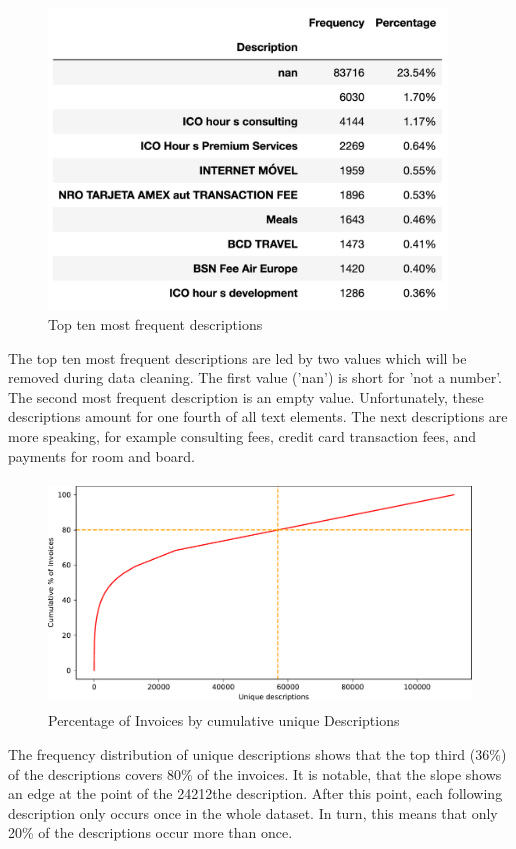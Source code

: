 \begin{figure}[!h]
	\centering
	\includegraphics[height=8cm]{Bilder/data_understanding/toptendescr.png}
	\caption{Top ten most frequent descriptions}
	\label{fig:descr-most-frequent}
\end{figure}
The top ten most frequent descriptions are led by two values which will be removed during data cleaning. The first value ('nan') is short for 'not a number'. The second most frequent description is an empty value. Unfortunately, these descriptions amount for one fourth of all text elements. The next descriptions are more speaking, for example consulting fees, credit card transaction fees, and payments for room and board.

\begin{figure}[!h]
	\centering
	\includegraphics[height=6cm]{Bilder/data_understanding/descriptions_pareto.pdf}
	\caption{Percentage of Invoices by cumulative unique Descriptions}
	\label{fig:descr-hist}
\end{figure}
The frequency distribution of unique descriptions shows that the top third (36\%) of the descriptions covers 80\% of the invoices. It is notable, that the slope shows an edge at the point of the 24212the description. After this point, each following description only occurs once in the whole dataset. In turn, this means that only 20\% of the descriptions occur more than once.

